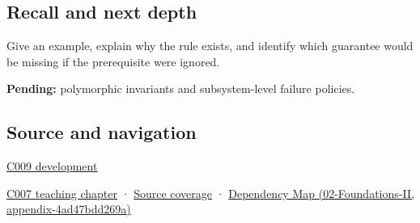 \subsection{Recall and next depth}\label{appendix-8e5214819615-recall-and-next-depth}

Give an example, explain why the rule exists, and identify which guarantee would be missing if the prerequisite were ignored.

\textbf{Pending:} polymorphic invariants and subsystem-level failure policies.

\subsection{Source and navigation}\label{appendix-8e5214819615-source-and-navigation}

\hyperref[appendix-fd090d982a15-m009---parts-127-147]{C009 development}

\hyperref[01-foundations-i-ch003-public-records-and-protected-invariants]{C007 teaching chapter} · \hyperref[appendix-fd090d982a15-m007---parts-101-112]{Source coverage} · \href{../02-Foundations-II/main.pdf\#nameddest=appendix-4ad47bdd269a}{Dependency Map (02-Foundations-II, appendix-4ad47bdd269a)}
